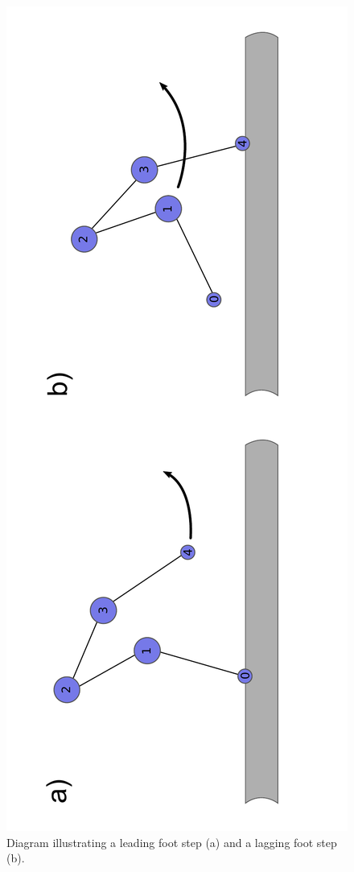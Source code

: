 \documentclass[12pt]{article}
\begin{document}
\begin{figure}[!hbt]
  \centering
  \includegraphics[angle=-90, width=1\columnwidth]{leading_vs_lagging}
  \caption{Diagram illustrating a leading foot step (a) and a lagging foot step (b).}
\end{figure}
\end{document}
